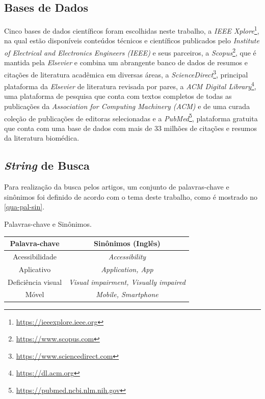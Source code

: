 \subsection{Bases de Dados}
Cinco bases de dados científicos foram escolhidas neste trabalho, a \emph{IEEE Xplore}\footnote{\url{https://ieeexplore.ieee.org}}, na qual estão disponíveis conteúdos técnicos e científicos publicados pelo \emph{Institute of Electrical and Electronics Engineers (IEEE)} e seus parceiros,
a \emph{Scopus}\footnote{\url{https://www.scopus.com}}, que é mantida pela \emph{Elsevier} e combina um abrangente banco de dados de resumos e citações de literatura acadêmica em diversas áreas, a \emph{ScienceDirect}\footnote{\url{https://www.sciencedirect.com}}, principal plataforma da \emph{Elsevier} de literatura revisada por pares,
a \emph{ACM Digital Library}\footnote{\url{https://dl.acm.org}}, uma plataforma de pesquisa que conta com textos completos de todas as publicações da \emph{Association for Computing Machinery (ACM)} e de uma curada coleção de publicações de editoras selecionadas e a \emph{PubMed}\footnote{\url{https://pubmed.ncbi.nlm.nih.gov}},
plataforma gratuita que conta com uma base de dados com mais de 33 milhões de citações e resumos da literatura biomédica.

\subsection{\emph{String} de Busca}
Para realização da busca pelos artigos, um conjunto de palavras-chave e sinônimos foi definido de acordo com o tema deste trabalho, como é mostrado no \autoref{qua-pal-sin}.

\begin{quadro}[htb]
  \caption{\label{qua-pal-sin}Palavras-chave e Sinônimos.}
  \begin{tabular}{|c|c|}
    \hline
    \textbf{Palavra-chave} & \textbf{Sinônimos (Inglês)}                 \\ \hline
    Acessibilidade         & \emph{Accessibility}                        \\ \hline
    Aplicativo             & \emph{Application, App}                     \\ \hline
    Deficiência visual     & \emph{Visual impairment, Visually impaired} \\ \hline
    Móvel                  & \emph{Mobile, Smartphone}                   \\ \hline
  \end{tabular}
\end{quadro}

